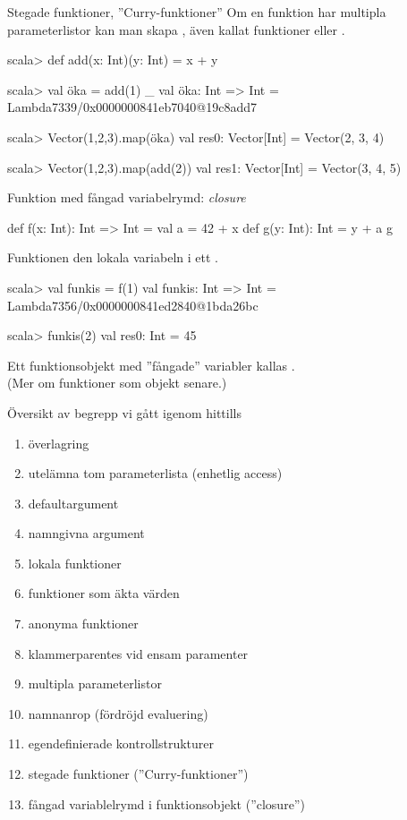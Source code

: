 \begin{Slide}{Stegade funktioner, ''Curry-funktioner''}
Om en funktion har multipla parameterlistor kan man skapa , även kallat  funktioner  eller .
\begin{REPLnonum}
scala> def add(x: Int)(y: Int) = x + y

scala> val öka = add(1) _
val öka: Int => Int = Lambda7339/0x0000000841eb7040@19c8add7

scala> Vector(1,2,3).map(öka)
val res0: Vector[Int] = Vector(2, 3, 4)

scala> Vector(1,2,3).map(add(2))
val res1: Vector[Int] = Vector(3, 4, 5)
\end{REPLnonum}
\end{Slide}


\begin{Slide}{Funktion med fångad variabelrymd: \textit{closure}}
\begin{Code}
def f(x: Int): Int => Int = 
  val a = 42 + x
  def g(y: Int): Int = y + a
  g
\end{Code}
Funktionen   den lokala variabeln  i ett .
\pause
\begin{REPLnonum}
scala> val funkis = f(1)
val funkis: Int => Int = Lambda7356/0x0000000841ed2840@1bda26bc

scala> funkis(2)
val res0: Int = 45
\end{REPLnonum}
\pause
Ett funktionsobjekt med ''fångade'' variabler kallas . \\
(Mer om funktioner som objekt senare.)
\end{Slide}

\ifkompendium\else
\begin{SlideExtra}{Översikt av begrepp vi gått igenom hittills}
\begin{enumerate}
\item överlagring
\item utelämna tom parameterlista (enhetlig access)
\item defaultargument
\item namngivna argument
\item lokala funktioner
\item funktioner som äkta värden
\item anonyma funktioner
\item klammerparentes vid ensam paramenter
\item multipla parameterlistor
\item namnanrop (fördröjd evaluering)
\item egendefinierade kontrollstrukturer
\item stegade funktioner (''Curry-funktioner'')
\item fångad variablelrymd i funktionsobjekt (''closure'')
\end{enumerate}
\end{SlideExtra}
\fi



